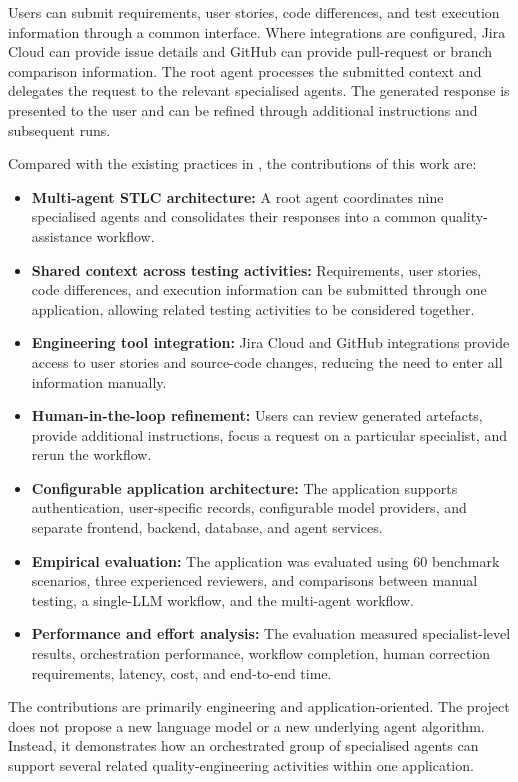 Users can submit requirements, user stories, code differences, and test execution information through a common interface. Where integrations are configured, Jira Cloud can provide issue details and GitHub can provide pull-request or branch comparison information. The root agent processes the submitted context and delegates the request to the relevant specialised agents. The generated response is presented to the user and can be refined through additional instructions and subsequent runs.

Compared with the existing practices in , the contributions of this work are:
\begin{itemize}
  \item \textbf{Multi-agent STLC architecture:} A root agent coordinates nine specialised agents and consolidates their responses into a common quality-assistance workflow.
  \item \textbf{Shared context across testing activities:} Requirements, user stories, code differences, and execution information can be submitted through one application, allowing related testing activities to be considered together.
  \item \textbf{Engineering tool integration:} Jira Cloud and GitHub integrations provide access to user stories and source-code changes, reducing the need to enter all information manually.
  \item \textbf{Human-in-the-loop refinement:} Users can review generated artefacts, provide additional instructions, focus a request on a particular specialist, and rerun the workflow.
  \item \textbf{Configurable application architecture:} The application supports authentication, user-specific records, configurable model providers, and separate frontend, backend, database, and agent services.
  \item \textbf{Empirical evaluation:} The application was evaluated using 60 benchmark scenarios, three experienced reviewers, and comparisons between manual testing, a single-LLM workflow, and the multi-agent workflow.
  \item \textbf{Performance and effort analysis:} The evaluation measured specialist-level results, orchestration performance, workflow completion, human correction requirements, latency, cost, and end-to-end time.
\end{itemize}
The contributions are primarily engineering and application-oriented. The project does not propose a new language model or a new underlying agent algorithm. Instead, it demonstrates how an orchestrated group of specialised agents can support several related quality-engineering activities within one application.

